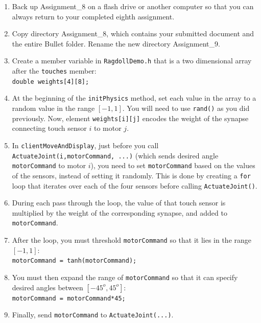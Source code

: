 \documentclass[12pt]{article}
\begin{document}
\begin{enumerate}

\item Back up Assignment\_8 on a flash drive or another computer so that you can always return to your completed eighth assignment.

\item Copy directory Assignment\_8, which contains your submitted document and the entire Bullet folder. Rename the new directory Assignment\_9.

\item Create a member variable in \verb|RagdollDemo.h| that is a two dimensional array after the \verb|touches| member:\\
    \texttt{double weights[4][8];}

\item At the beginning of the \texttt{initPhysics} method, set each value in the array to a random value in the range $[-1,1]$. You will need to use \texttt{rand()} as you did previously. Now, element \texttt{weights[i][j]} encodes the weight of the synapse connecting touch sensor $i$ to motor $j$.

\item In \texttt{clientMoveAndDisplay}, just before you call \texttt{ActuateJoint(i,motorCommand, ...)} (which sends desired angle \texttt{motorCommand} to motor $i$), you need to set \texttt{motorCommand} based on the values of the sensors, instead of setting it randomly. This is done by creating a \texttt{for} loop that iterates over each of the four sensors before calling \texttt{ActuateJoint()}.

\item During each pass through the loop, the value of that touch sensor is multiplied by the weight of the corresponding synapse, and added to \texttt{motorCommand}.

\item After the loop, you must threshold \texttt{motorCommand} so that it lies in the range $[-1,1]$:\\
    \texttt{motorCommand = tanh(motorCommand);}

\item You must then expand the range of \texttt{motorCommand} so that it can specify desired angles between $[-45^o,45^o]$: \\
    \texttt{motorCommand = motorCommand*45;}

\item Finally, send \texttt{motorCommand} to \texttt{ActuateJoint(...)}.


\end{enumerate}
\end{document}
